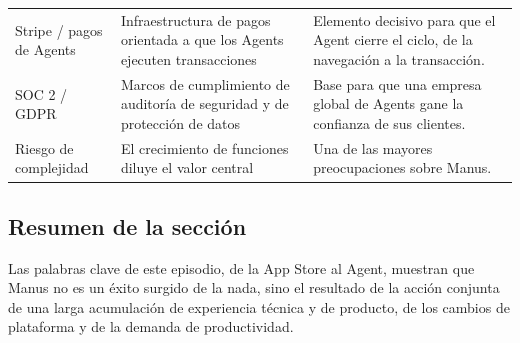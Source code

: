 \begin{longtable}{p{}p{}p{}}
Stripe / pagos de Agents & Infraestructura de pagos orientada a que los Agents ejecuten transacciones & Elemento decisivo para que el Agent cierre el ciclo, de la navegación a la transacción. \\
SOC 2 / GDPR & Marcos de cumplimiento de auditoría de seguridad y de protección de datos & Base para que una empresa global de Agents gane la confianza de sus clientes. \\
Riesgo de complejidad & El crecimiento de funciones diluye el valor central & Una de las mayores preocupaciones sobre Manus. \\
\bottomrule
\end{longtable}

\subsection{Resumen de la sección}

Las palabras clave de este episodio, de la App Store al Agent, muestran que Manus no es un éxito surgido de la nada, sino el resultado de la acción conjunta de una larga acumulación de experiencia técnica y de producto, de los cambios de plataforma y de la demanda de productividad.
